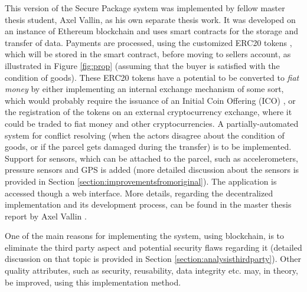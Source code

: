 This version of the Secure Package system was implemented by fellow master thesis student, Axel Vallin, as his own separate thesis work. It was developed on an instance of Ethereum blockchain and uses smart contracts for the storage and transfer of data. Payments are processed, using the customized ERC20 tokens \citep{erc20}, which will be stored in the smart contract, before moving to sellers account, as illustrated in Figure \ref{fig:prop} (assuming that the buyer is satisfied with the condition of goods). These ERC20 tokens have a potential to be converted to \emph{\gls{fiat money}} by either implementing an internal exchange mechanism of some sort, which would probably require the issuance of an Initial Coin Offering (ICO) \citep{ico}, or the registration of the tokens on an external cryptocurrency exchange, where it could be traded to fiat money and other cryptocurrencies. A partially-automated system for conflict resolving (when the actors disagree about the condition of goods, or if the parcel gets damaged during the transfer) is to be implemented. Support for sensors, which can be attached to the parcel, such as accelerometers, pressure sensors and GPS is added (more detailed discussion about the sensors is provided in Section \ref{section:improvementsfromoriginal}). The application is accessed though a web interface. More details, regarding the decentralized implementation and its development process, can be found in the master thesis report by Axel Vallin \citep{axelrapport}.

One of the main reasons for implementing the system, using blockchain, is to eliminate the third party aspect and potential security flaws regarding it (detailed discussion on that topic is provided in Section \ref{section:analysisthirdparty}). Other quality attributes, such as security, reusability, data integrity etc. may, in theory, be improved, using this implementation method.



